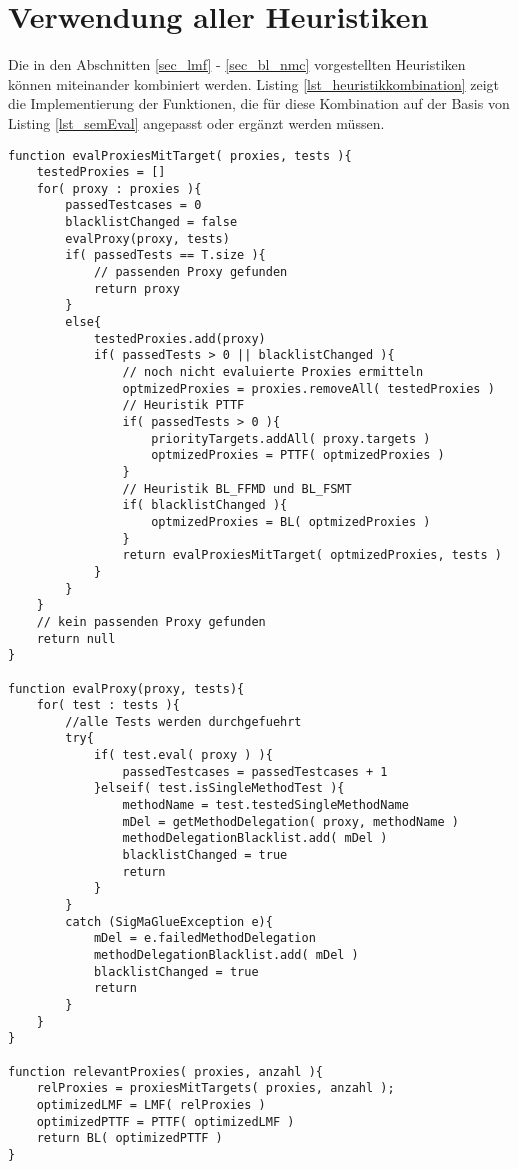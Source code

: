 \chapter{Verwendung aller Heuristiken}\label{app_semEvalMitAllenHeuristiken}
Die in den Abschnitten \ref{sec_lmf} - \ref{sec_bl_nmc} vorgestellten Heuristiken können miteinander kombiniert werden. Listing \ref{lst_heuristikkombination} zeigt die Implementierung der Funktionen, die für diese Kombination auf der Basis von Listing \ref{lst_semEval} angepasst oder ergänzt werden müssen.

\begin{lstlisting}[style = pseudo, caption = Kombination aller Heuristiken, captionpos = b, label = lst_heuristikkombination]
function evalProxiesMitTarget( proxies, tests ){
	testedProxies = []
	for( proxy : proxies ){
		passedTestcases = 0
		blacklistChanged = false
		evalProxy(proxy, tests)
		if( passedTests == T.size ){
			// passenden Proxy gefunden
			return proxy
		}
		else{
			testedProxies.add(proxy)
			if( passedTests > 0 || blacklistChanged ){
				// noch nicht evaluierte Proxies ermitteln
				optmizedProxies = proxies.removeAll( testedProxies )
				// Heuristik PTTF
				if( passedTests > 0 ){
					priorityTargets.addAll( proxy.targets )
					optmizedProxies = PTTF( optmizedProxies )	
				}
				// Heuristik BL_FFMD und BL_FSMT
				if( blacklistChanged ){
					optmizedProxies = BL( optmizedProxies )	
				}
				return evalProxiesMitTarget( optmizedProxies, tests )
			}
		}
	}
	// kein passenden Proxy gefunden
	return null
}

function evalProxy(proxy, tests){
	for( test : tests ){
		//alle Tests werden durchgefuehrt	
		try{
			if( test.eval( proxy ) ){
				passedTestcases = passedTestcases + 1
			}elseif( test.isSingleMethodTest ){
				methodName = test.testedSingleMethodName
				mDel = getMethodDelegation( proxy, methodName )
				methodDelegationBlacklist.add( mDel )
				blacklistChanged = true
				return
			}
		}
		catch (SigMaGlueException e){
			mDel = e.failedMethodDelegation
			methodDelegationBlacklist.add( mDel )
			blacklistChanged = true
			return
		} 
	}
}

function relevantProxies( proxies, anzahl ){
	relProxies = proxiesMitTargets( proxies, anzahl );
	optimizedLMF = LMF( relProxies )
	optimizedPTTF = PTTF( optimizedLMF )
	return BL( optimizedPTTF )
} 


\end{lstlisting}